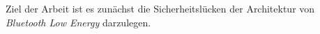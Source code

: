 Ziel der Arbeit ist es zunächst die Sicherheitslücken der Architektur von \textit{Bluetooth Low Energy} darzulegen.